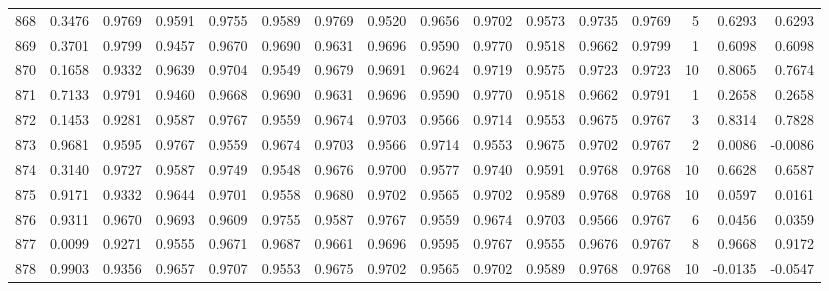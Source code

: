 \begin{tabular}{lrrrrrrrrrrrrrrr}
868 &      0.3476 &  0.9769 &  0.9591 &  0.9755 &  0.9589 &  0.9769 &  0.9520 &  0.9656 &  0.9702 &  0.9573 &   0.9735 &     0.9769 &      5 &                    0.6293 &                     0.6293 \\
869 &      0.3701 &  0.9799 &  0.9457 &  0.9670 &  0.9690 &  0.9631 &  0.9696 &  0.9590 &  0.9770 &  0.9518 &   0.9662 &     0.9799 &      1 &                    0.6098 &                     0.6098 \\
870 &      0.1658 &  0.9332 &  0.9639 &  0.9704 &  0.9549 &  0.9679 &  0.9691 &  0.9624 &  0.9719 &  0.9575 &   0.9723 &     0.9723 &     10 &                    0.8065 &                     0.7674 \\
871 &      0.7133 &  0.9791 &  0.9460 &  0.9668 &  0.9690 &  0.9631 &  0.9696 &  0.9590 &  0.9770 &  0.9518 &   0.9662 &     0.9791 &      1 &                    0.2658 &                     0.2658 \\
872 &      0.1453 &  0.9281 &  0.9587 &  0.9767 &  0.9559 &  0.9674 &  0.9703 &  0.9566 &  0.9714 &  0.9553 &   0.9675 &     0.9767 &      3 &                    0.8314 &                     0.7828 \\
873 &      0.9681 &  0.9595 &  0.9767 &  0.9559 &  0.9674 &  0.9703 &  0.9566 &  0.9714 &  0.9553 &  0.9675 &   0.9702 &     0.9767 &      2 &                    0.0086 &                    -0.0086 \\
874 &      0.3140 &  0.9727 &  0.9587 &  0.9749 &  0.9548 &  0.9676 &  0.9700 &  0.9577 &  0.9740 &  0.9591 &   0.9768 &     0.9768 &     10 &                    0.6628 &                     0.6587 \\
875 &      0.9171 &  0.9332 &  0.9644 &  0.9701 &  0.9558 &  0.9680 &  0.9702 &  0.9565 &  0.9702 &  0.9589 &   0.9768 &     0.9768 &     10 &                    0.0597 &                     0.0161 \\
876 &      0.9311 &  0.9670 &  0.9693 &  0.9609 &  0.9755 &  0.9587 &  0.9767 &  0.9559 &  0.9674 &  0.9703 &   0.9566 &     0.9767 &      6 &                    0.0456 &                     0.0359 \\
877 &      0.0099 &  0.9271 &  0.9555 &  0.9671 &  0.9687 &  0.9661 &  0.9696 &  0.9595 &  0.9767 &  0.9555 &   0.9676 &     0.9767 &      8 &                    0.9668 &                     0.9172 \\
878 &      0.9903 &  0.9356 &  0.9657 &  0.9707 &  0.9553 &  0.9675 &  0.9702 &  0.9565 &  0.9702 &  0.9589 &   0.9768 &     0.9768 &     10 &                   -0.0135 &                    -0.0547 \\

\end{tabular}

